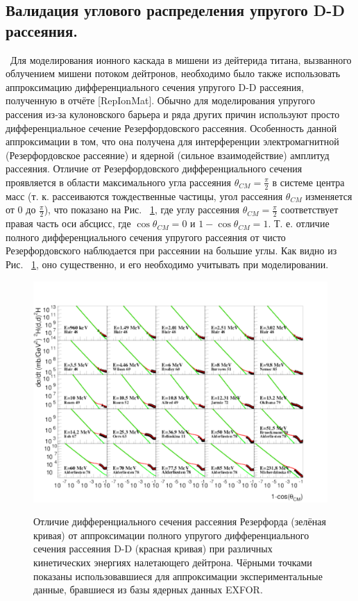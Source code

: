 \documentclass[a4paper,12pt]{article}
\begin{document}
\begin{large}
\section{Валидация углового распределения упругого D-D рассеяния.}
\label{ValElasticDD}
\
	Для моделирования ионного каскада в мишени из дейтерида титана, вызванного облучением мишени потоком дейтронов, необходимо было также использовать аппроксимацию дифференциального сечения упругого D-D рассеяния, полученную в отчёте [RepIonMat].
	Обычно для моделирования упругого рассения из-за кулоновского барьера и ряда других причин используют просто дифференциальное сечение Резерфордовского рассеяния.
	Особенность данной аппроксимации в том, что она получена для интерференции электромагнитной (Резерфордовское рассеяние) и ядерной (сильное взаимодействие) амплитуд рассеяния.
	Отличие от Резерфордовского дифференциального сечения проявляется в области максимального угла рассеяния $\theta_{CM}=\frac{\pi}{2}$ в системе центра масс (т. к. рассеиваются тождественные частицы, угол рассеяния $\theta_{CM}$ изменяется от 0 до $\frac{\pi}{2}$), что показано на Рис. ~\ref{fig:DifferenceOfElasticDDFromRutherfordDifferentialCrossSection}, где углу рассеяния $\theta_{CM}=\frac{\pi}{2}$ соответствует правая часть оси абсцисс, где $\cos{\theta_{CM}}=0$ и $1-\cos{\theta_{CM}}=1$.
	Т. е. отличие полного дифференциального сечения упругого рассеяния от чисто Резерфордовского наблюдается при рассеянии на большие углы.
	Как видно из Рис. ~\ref{fig:DifferenceOfElasticDDFromRutherfordDifferentialCrossSection}, оно существенно, и его необходимо учитывать при моделировании.
	
\begin{figure}[ht]
  {
     \includegraphics[width=0.99\linewidth]{images/difference_of_elastic_dd_from_rutherford_differential_cross_section.pdf}
  }
  \caption{Отличие дифференциального сечения рассеяния Резерфорда (зелёная кривая) от аппроксимации полного упругого дифференциального сечения рассеяния D-D (красная кривая) при различных кинетических энергиях налетающего дейтрона. Чёрными точками показаны использовавшиеся для аппроксимации экспериментальные данные, бравшиеся из базы ядерных данных EXFOR.}
  \label{fig:DifferenceOfElasticDDFromRutherfordDifferentialCrossSection}
\end{figure}	
	

\end{large}
\end{document}
